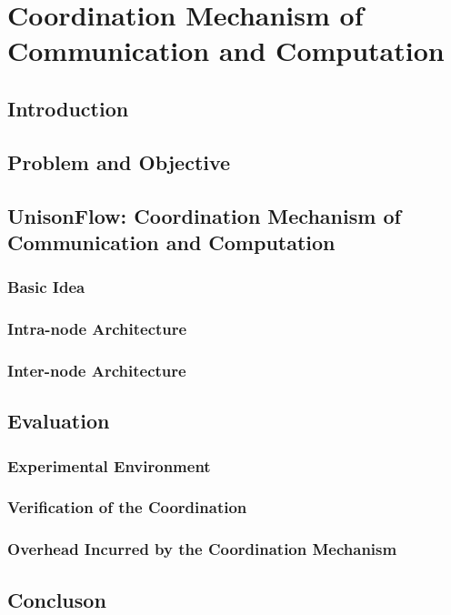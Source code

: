 \chapter{Coordination Mechanism of Communication and Computation}

\section{Introduction}

\section{Problem and Objective}

\section{UnisonFlow: Coordination Mechanism of Communication and Computation}

\subsection{Basic Idea}

\subsection{Intra-node Architecture}

\subsection{Inter-node Architecture}

\section{Evaluation}

\subsection{Experimental Environment}

\subsection{Verification of the Coordination}

\subsection{Overhead Incurred by the Coordination Mechanism}

\section{Concluson}
